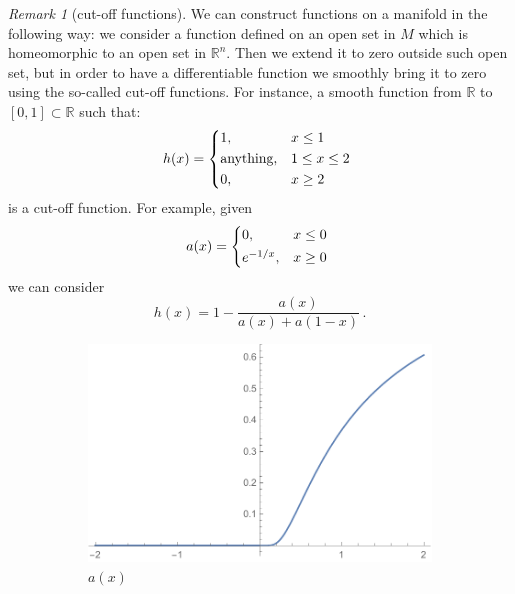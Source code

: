 \documentclass[a4paper,11pt,titlepage, article, oneside]{memoir}
\numberwithin{equation}{section}
\theoremstyle{definition}
\theoremstyle{remark}
\newtheorem{remark}[theorem]{Remark}
\newcommand{\rfield}{\mathbb{R}}
\begin{document}
\begin{remarkbox}\begin{remark}[cut-off functions]
  We can construct functions on a manifold in the following way: we consider a function defined on an open set in $M$ which is homeomorphic to an open set in $\rfield^n$. Then we extend it to zero outside such open set, but in order to have a differentiable function we smoothly bring it to zero using the so-called cut-off functions.
  For instance, a smooth function from $\rfield$ to $[0, 1] \subset \rfield$ such that:
  \begin{equation*}
    h(x) = \begin{cases*}
     1, & $x \le 1$ \\
     \text{anything}, &  $1 \le x \le 2$ \\
     0, & $x \ge 2$
  \end{cases*}
  \end{equation*}
  is a cut-off function.
  For example, given
  \begin{equation*}
    a(x) = \begin{cases*}
     0, & $x \le 0$ \\
     e^{-1/x}, & $x \ge 0$
  \end{cases*}
  \end{equation*}
  we can consider
  \begin{equation*}
    h(x) = 1 - \frac{a(x)}{a(x) + a(1-x)} \, .
  \end{equation*}
  \begin{figure}[H]
  \centering
  \begin{subfigure}{.5\textwidth}
    \centering
    \includegraphics[width=.9\linewidth]{Images/cutoff_1.pdf}
    \caption{$a(x)$}
  \end{subfigure}%
  \begin{subfigure}{.5\textwidth}

\end{subfigure}
\end{figure}
\end{remark}
\end{remarkbox}
\end{document}
